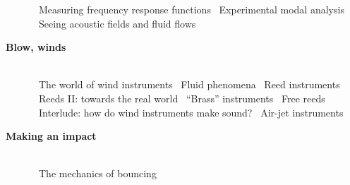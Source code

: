 \begin{description}
\quad{\gre \pageref{s:4ff8f074}}~Measuring frequency response functions
\quad{\gre \pageref{s:cdd6169a}}~Experimental modal analysis
\quad{\gre \pageref{s:835a5127}}~Seeing acoustic fields and fluid flows
\item[\hspace{-1cm}{\gre{}\pageref{s:9282ee20}}\hspace{+0cm} \large\bf\sf \blu Blow, winds]\hfill \\ 
\quad{\gre \pageref{s:052b8c63}}~The world of wind instruments
\quad{\gre \pageref{s:640e2fb8}}~Fluid phenomena
\quad{\gre \pageref{s:64819e9d}}~Reed instruments
\quad{\gre \pageref{s:22e4c5c8}}~Reeds II: towards the real world
\quad{\gre \pageref{s:cb7d9f7c}}~``Brass'' instruments
\quad{\gre \pageref{s:6c2b0661}}~Free reeds
\quad{\gre \pageref{s:58f855f7}}~Interlude: how do wind instruments  make sound?
\quad{\gre \pageref{s:ede5032a}}~Air-jet instruments
\item[\hspace{-1cm}{\gre{}\pageref{s:81fc3d3e}}\hspace{+0cm} \large\bf\sf \blu Making an impact]\hfill \\ 
\quad{\gre \pageref{s:5be23a02}}~The mechanics of bouncing\end{description}